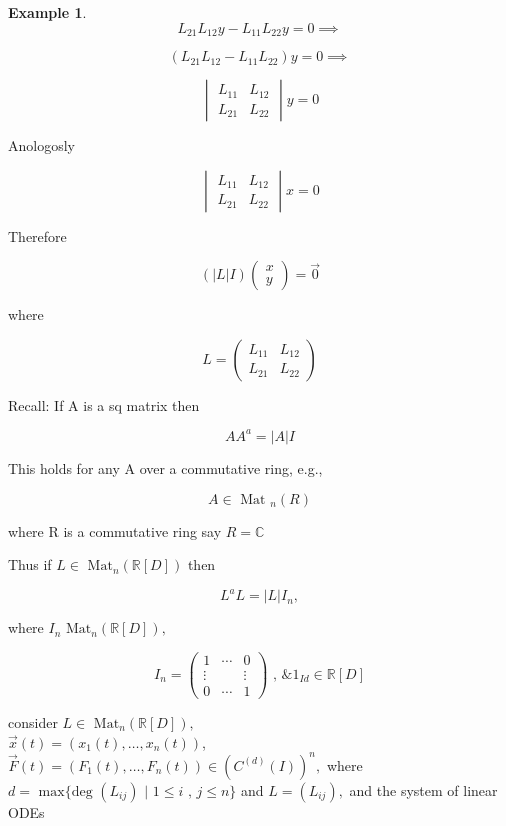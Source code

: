 \documentclass[12pt,a4paper]{article}
\theoremstyle{definition}
\newtheorem*{example}{Example}
\begin{document}
\begin{example}
  \hline

  \[ L_{21}L_{12}y - L_{11}L_{22}y = 0 \implies \]

  \[ (L_{21}L_{12} - L_{11}L_{22}) y= 0 \implies \]

  \[ 
  \begin{vmatrix}
    L_{11} & L_{12} \\
    L_{21} & L_{22}
  \end{vmatrix}
  y
  = 0
  \]

  Anologosly 

  
  \[ 
  \begin{vmatrix}
    L_{11} & L_{12} \\
    L_{21} & L_{22}
  \end{vmatrix}
  x
  = 0
  \]

  Therefore

  \[ ( |L|I) 
  \begin{pmatrix}
    x \\
    y
  \end{pmatrix}
   = \vec{0}
  \]

  where

  \[
  L=
  \begin{pmatrix}
    L_{11} & L_{12} \\
    L_{21} & L_{22}
  \end{pmatrix}
  \]

  Recall: If A is a sq matrix then 

  \[ AA^a = |A|I \]

  This holds for any A over a commutative ring, e.g., 

  \[ A \in \text{ Mat }_n(R) \]

  where R is a commutative ring say \( R = \mathbb{C} \)

  Thus if \( L \in \text{ Mat}_n( \mathbb{R}[D]) \) then 

  \[ L^aL = |L|I_n, \]

  where \( I_n \text{ Mat}_n( \mathbb{R}[D]),  \)

\[ 
I_n = 
\begin{pmatrix}
  1 & \cdots & 0 \\
  \vdots &  & \vdots \\
  0 & \cdots & 1
\end{pmatrix}
\text{ , \& }
1_{Id} \in \mathbb{R}[D]
\]

consider \( L \in \text{ Mat}_n( \mathbb{R}[D]), \) \\

\( \vec{x}(t) = (x_1(t), \dots , x_n(t)) \), \( \vec{F}(t) = (F_1(t),
\dots, F_n(t)) \in (C^{(d)}(I))^n,\) where \( d= \text{ max} \{ \text{
deg }(L_{ij}) \text{ | } 1 \leq i \text{ , } j \leq n \} \) and \( L =
(L_{ij}),  \) and the system of linear ODEs


\end{example}
\end{document}
